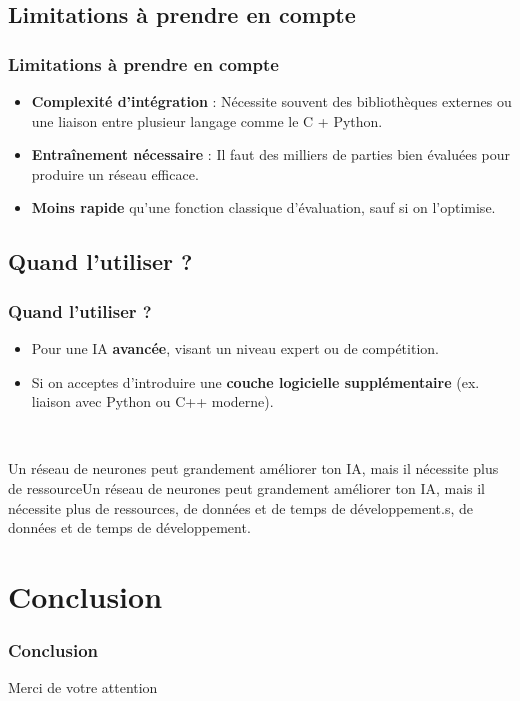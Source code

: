 \documentclass[9pt]{beamer}
\begin{document}
\subsection{Limitations à prendre en compte}
\begin{frame}
  \frametitle{Limitations à prendre en compte}
  \begin{itemize}
    \item \textbf{Complexité d’intégration} : Nécessite souvent des bibliothèques externes ou une liaison entre plusieur langage comme le C + Python.
    \item \textbf{Entraînement nécessaire} : Il faut des milliers de parties bien évaluées pour produire un réseau efficace.
    \item \textbf{Moins rapide} qu’une fonction classique d'évaluation, sauf si on l'optimise.
  \end{itemize}
\end{frame}

\subsection{Quand l’utiliser ?}
\begin{frame}
  \frametitle{Quand l’utiliser ?}
  \begin{itemize}
    \item Pour une IA \textbf{avancée}, visant un niveau expert ou de compétition.
    \item Si on acceptes d’introduire une \textbf{couche logicielle supplémentaire} (ex. liaison avec Python ou C++ moderne).
  \end{itemize}

  ~

  Un réseau de neurones peut grandement améliorer ton IA, mais il nécessite plus de ressourceUn réseau de neurones peut grandement améliorer ton IA, mais il nécessite plus de ressources, de données et de temps de développement.s, de données et de temps de développement.
\end{frame}

\section{Conclusion}
\begin{frame}
  \frametitle{Conclusion}
  Merci de votre attention
\end{frame}
\end{document}
